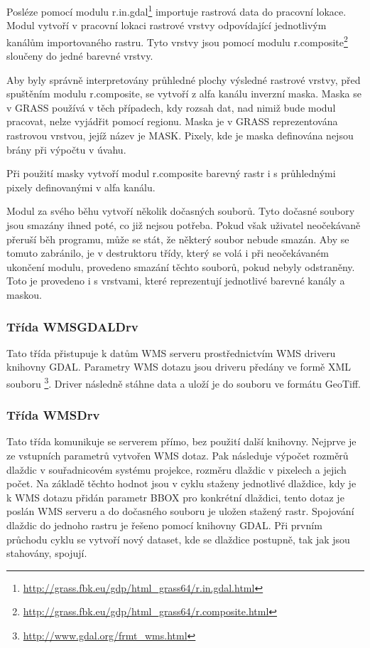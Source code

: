 \documentclass[a4paper,12pt]{article}
\begin{document}
Posléze pomocí modulu r.in.gdal\footnote{\url{http://grass.fbk.eu/gdp/html_grass64/r.in.gdal.html}} importuje rastrová data do pracovní lokace.
Modul vytvoří v pracovní lokaci rastrové vrstvy odpovídající jednotlivým kanálům importovaného rastru. Tyto vrstvy jsou pomocí modulu  r.composite\footnote{\url{http://grass.fbk.eu/gdp/html_grass64/r.composite.html}} sloučeny do jedné barevné vrstvy. 

Aby byly správně interpretovány průhledné plochy výsledné rastrové vrstvy, před spuštěním modulu r.composite, se vytvoří z alfa kanálu inverzní maska. Maska se v GRASS používá v těch případech, kdy rozsah dat, nad nimiž bude modul pracovat, nelze vyjádřit pomocí regionu. Maska je v GRASS reprezentována rastrovou vrstvou, jejíž název je MASK. Pixely, kde je maska definována nejsou brány při výpočtu v úvahu. 

Při použití masky vytvoří modul r.composite barevný rastr i s průhlednými pixely definovanými v alfa kanálu.

Modul za svého běhu vytvoří několik dočasných souborů. Tyto dočasné soubory jsou smazány ihned poté, co již nejsou potřeba. Pokud však uživatel neočekávaně přeruší běh programu, může se stát, že některý soubor nebude smazán. Aby se tomuto zabránilo,
je v destruktoru třídy, který se volá i při neočekávaném ukončení modulu, provedeno smazání těchto souborů, pokud nebyly odstraněny. Toto je provedeno i s vrstvami, které reprezentují jednotlivé barevné kanály a maskou. 





\subsubsection{Třída WMSGDALDrv}

Tato třída přistupuje k datům WMS serveru prostřednictvím WMS driveru knihovny GDAL. Parametry WMS dotazu jsou driveru předány ve formě XML souboru \footnote{\url{http://www.gdal.org/frmt_wms.html}}. 
Driver následně stáhne data a uloží je do souboru ve formátu GeoTiff. 



\subsubsection{Třída WMSDrv}

Tato třída komunikuje se serverem přímo, bez použití další knihovny. Nejprve je ze vstupních parametrů vytvořen WMS dotaz. 
Pak následuje výpočet rozměrů dlaždic v souřadnicovém systému projekce, rozměru dlaždic v pixelech a jejich počet. Na základě těchto hodnot jsou v cyklu staženy jednotlivé dlaždice, kdy je k WMS dotazu přidán parametr BBOX pro konkrétní dlaždici, tento dotaz je poslán WMS serveru a do dočasného souboru je uložen stažený rastr. Spojování dlaždic do jednoho rastru je řešeno pomocí knihovny GDAL. Při prvním průchodu cyklu se vytvoří nový dataset, kde se dlaždice postupně, tak jak jsou stahovány, spojují. 
\end{document}
